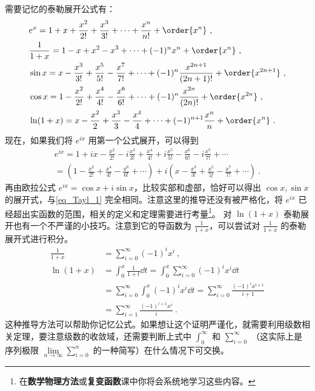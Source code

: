 需要记忆的泰勒展开公式有：
\begin{equation}\label{eq_Tayl_1}
\begin{aligned}
&e^x=1+x+\frac{x^2}{2!}+\frac{x^3}{3!}+\cdots+\frac{x^n}{n!}+\order{x^n}~,\\
&\frac{1}{1+x}=1-x+x^2-x^3+\cdots+(-1)^nx^n+\order{x^n}~,\\
&\sin x=x-\frac{x^3}{3!}+\frac{x^5}{5!}-\frac{x^7}{7!}+\cdots+(-1)^n\frac{x^{2n+1}}{(2n+1)!}+\order{x^{2n+1}}~,\\
&\cos x=1-\frac{x^2}{2!}+\frac{x^4}{4!}-\frac{x^6}{6!}+\cdots+(-1)^n\frac{x^{2n}}{(2n)!}+\order{x^{2n}}~,\\
&\ln (1+x)=x-\frac{x^2}{2}+\frac{x^3}{3}-\frac{x^4}{4}+\cdots+(-1)^{n+1}\frac{x^n}{n}+\order{x^n}~.\\
\end{aligned}
\end{equation}
现在，如果我们将 $e^{ix}$ 用第一个公式展开，可以得到
\begin{equation}
\begin{aligned}
e^{ix}=1+ix-\frac{x^2}{2!}-i\frac{x^3}{3!}+\frac{x^4}{4!}+i\frac{x^5}{5!}-\frac{x^6}{6!}-i\frac{x^7}{7!}+\cdots\\
=(1-\frac{x^2}{2!}+\frac{x^4}{4!}-\frac{x^6}{6!}+\cdots)+i(x-\frac{x^3}{3!}+\frac{x^5}{5!}-\frac{x^7}{7!}+\cdots)~.
\end{aligned}
\end{equation}
再由欧拉公式 $e^{ix}=\cos x+i\sin x$，比较实部和虚部，恰好可以得出 $\cos x,\sin x$ 的展开式，与\autoref{eq_Tayl_1} 完全相同。注意这里的推导还没有被严格化，将 $e^{ix}$ 已经超出实函数的范围，相关的定义和定理需要进行考量\footnote{在\textbf{数学物理方法}或\textbf{复变函数}课中你将会系统地学习这些内容。}。
对 $\ln(1+x)$ 泰勒展开也有一个不严谨的小技巧。注意到它的导函数为 $\frac{1}{1+x}$，可以尝试对 $\frac{1}{1+x}$ 的泰勒展开式进行积分。
\begin{equation}
\begin{aligned}
\frac{1}{1+x}&=\sum_{i=0}^{\infty} (-1)^i x^i~,\\
\ln(1+x)&=\int_0^x \frac{1}{1+t}\dd t = \int_0^x \sum_{i=0}^{\infty} (-1)^i x^i\dd t \\
&= \sum_{i=0}^{\infty} \int_0^x(-1)^i x^i\dd t = \sum_{i=0}^{\infty} \frac{(-1)^i x^{i+1}}{i+1}\\
&= \sum_{i=1}^{\infty} \frac{(-1)^{i+1} x^{i}}{i}~.
\end{aligned}
\end{equation}
这种推导方法可以帮助你记忆公式。如果想让这个证明严谨化，就需要利用级数相关定理，要注意级数的收敛域，还需要判断上式中 $\int_0^{\infty}$ 和 $\sum_{i=0}^{\infty}$ （这实际上是序列极限 $\lim\limits_{n\rightarrow \infty} \sum_{i=0}^{n}$ 的一种简写）在什么情况下可交换。
